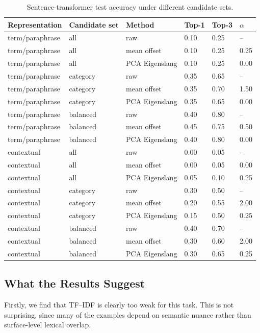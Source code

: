 \documentclass{article}
\begin{document}
\begin{table}
  \caption{Sentence-transformer test accuracy under different candidate sets.}
  \label{tab:candidate-results}
  \centering
  \begin{tabular}{llllll}
    \toprule
    Representation & Candidate set & Method & Top-1 & Top-3 & $\alpha$ \\
    \midrule
    term/paraphrase & all & raw & 0.10 & 0.25 & -- \\
    term/paraphrase & all & mean offset & 0.10 & 0.25 & 0.25 \\
    term/paraphrase & all & PCA Eigenslang & 0.10 & 0.25 & 0.00 \\
    term/paraphrase & category & raw & 0.35 & 0.65 & -- \\
    term/paraphrase & category & mean offset & 0.35 & 0.70 & 1.50 \\
    term/paraphrase & category & PCA Eigenslang & 0.35 & 0.65 & 0.00 \\
    term/paraphrase & balanced & raw & 0.40 & 0.80 & -- \\
    term/paraphrase & balanced & mean offset & 0.45 & 0.75 & 0.50 \\
    term/paraphrase & balanced & PCA Eigenslang & 0.40 & 0.80 & 0.00 \\
    contextual & all & raw & 0.00 & 0.05 & -- \\
    contextual & all & mean offset & 0.00 & 0.05 & 0.00 \\
    contextual & all & PCA Eigenslang & 0.05 & 0.10 & 0.25 \\
    contextual & category & raw & 0.30 & 0.50 & -- \\
    contextual & category & mean offset & 0.20 & 0.55 & 2.00 \\
    contextual & category & PCA Eigenslang & 0.15 & 0.50 & 0.25 \\
    contextual & balanced & raw & 0.40 & 0.70 & -- \\
    contextual & balanced & mean offset & 0.30 & 0.60 & 2.00 \\
    contextual & balanced & PCA Eigenslang & 0.30 & 0.65 & 0.25 \\
    \bottomrule
  \end{tabular}
\end{table}

\subsection{What the Results Suggest}
Firstly, we find that TF--IDF is clearly too weak for this task.
This is not surprising, since many of the examples depend on semantic nuance rather than surface-level lexical overlap.
\end{document}
